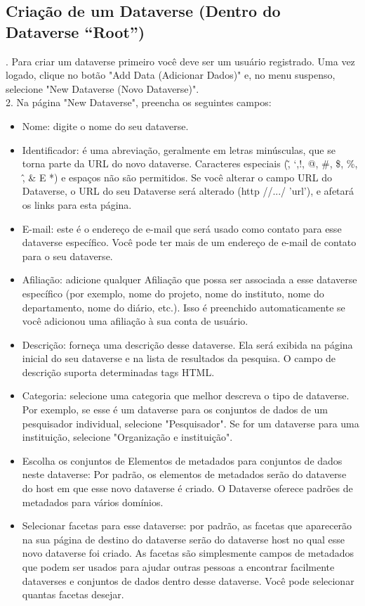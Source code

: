 \documentclass[12pt,hidelinks]{article}
\begin{document}
\subsection{Criação de um Dataverse (Dentro do Dataverse “Root”)}
    
. Para criar um dataverse primeiro você deve ser um usuário registrado. Uma vez logado, clique no botão "Add Data (Adicionar Dados)" e, no menu suspenso, selecione "New Dataverse (Novo Dataverse)".\\

2. Na página "New Dataverse", preencha os seguintes campos:

\begin{itemize}

 \item Nome: digite o nome do seu dataverse.
 \item Identificador: é uma abreviação, geralmente em letras minúsculas, que se torna parte da URL do novo dataverse. Caracteres especiais (\~, `,!, @, \#, \$, \%, \^, \& E *) e espaços não são permitidos. Se você alterar o campo URL do Dataverse, o URL do seu Dataverse será alterado (http //.../ 'url'), e afetará os links para esta página. 
 
 \item E-mail: este é o endereço de e-mail que será usado como contato para esse dataverse específico. Você pode ter mais de um endereço de e-mail de contato para o seu dataverse.
\item Afiliação: adicione qualquer Afiliação que possa ser associada a esse dataverse específico (por exemplo, nome do projeto, nome do instituto, nome do departamento, nome do diário, etc.). Isso é preenchido automaticamente se você adicionou uma afiliação à sua conta de usuário.
\item Descrição: forneça uma descrição desse dataverse. Ela será exibida na página inicial do seu dataverse e na lista de resultados da pesquisa. O campo de descrição suporta determinadas tags HTML.
\item  Categoria: selecione uma categoria que melhor descreva o tipo de dataverse. Por exemplo, se esse é um dataverse para os conjuntos de dados de um pesquisador individual, selecione "Pesquisador". Se for um dataverse para uma instituição, selecione "Organização e instituição".
\item  Escolha os conjuntos de Elementos de metadados para conjuntos de dados neste dataverse: Por padrão, os elementos de metadados serão do dataverse do host em que esse novo dataverse é criado. O Dataverse oferece padrões de metadados para vários domínios.
\item Selecionar facetas para esse dataverse: por padrão, as facetas que aparecerão na sua página de destino do dataverse serão do dataverse host no qual esse novo dataverse foi criado. As facetas são simplesmente campos de metadados que podem ser usados para ajudar outras pessoas a encontrar facilmente dataverses e conjuntos de dados dentro desse dataverse. Você pode selecionar quantas facetas desejar.

 \end{itemize}
 
\end{document}
